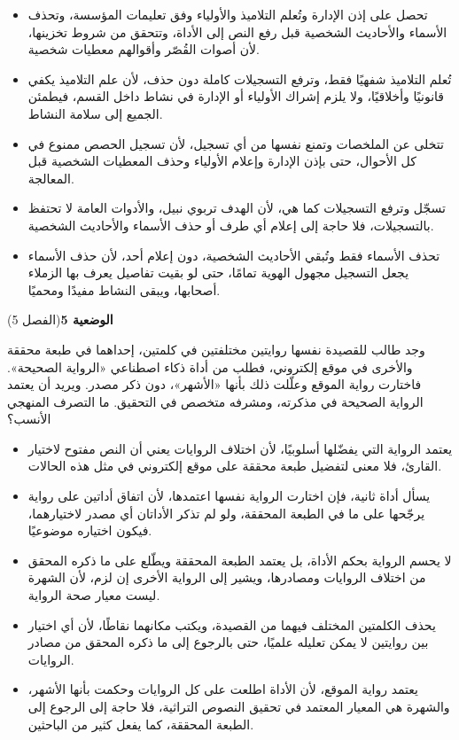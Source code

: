 \documentclass[11pt,a4paper]{article}
\begin{document}
\begin{itemize}[leftmargin=1.0cm, labelsep=6pt, itemsep=3pt, topsep=4pt, parsep=0pt]
  \item[\textbf{أ)}] تحصل على إذن الإدارة وتُعلم التلاميذ والأولياء وفق تعليمات المؤسسة، وتحذف الأسماء والأحاديث الشخصية قبل رفع النص إلى الأداة، وتتحقق من شروط تخزينها، لأن أصوات القُصّر وأقوالهم معطيات شخصية.
  \item[\textbf{ب)}] تُعلم التلاميذ شفهيًا فقط، وترفع التسجيلات كاملة دون حذف، لأن علم التلاميذ يكفي قانونيًا وأخلاقيًا، ولا يلزم إشراك الأولياء أو الإدارة في نشاط داخل القسم، فيطمئن الجميع إلى سلامة النشاط.
  \item[\textbf{ج)}] تتخلى عن الملخصات وتمنع نفسها من أي تسجيل، لأن تسجيل الحصص ممنوع في كل الأحوال، حتى بإذن الإدارة وإعلام الأولياء وحذف المعطيات الشخصية قبل المعالجة.
  \item[\textbf{د)}] تسجّل وترفع التسجيلات كما هي، لأن الهدف تربوي نبيل، والأدوات العامة لا تحتفظ بالتسجيلات، فلا حاجة إلى إعلام أي طرف أو حذف الأسماء والأحاديث الشخصية.
  \item[\textbf{هـ)}] تحذف الأسماء فقط وتُبقي الأحاديث الشخصية، دون إعلام أحد، لأن حذف الأسماء يجعل التسجيل مجهول الهوية تمامًا، حتى لو بقيت تفاصيل يعرف بها الزملاء أصحابها، ويبقى النشاط مفيدًا ومحميًا.
\end{itemize}
\par\vspace{6pt}
\noindent
{\large\khatt\textbf{الوضعية 5}}\hfill{\small(الفصل 5)}\par\nopagebreak\vspace{3pt}
\setlength{\fboxsep}{7pt}\colorbox{gray!10}{\parbox{\dimexpr\linewidth-14pt}{وجد طالب للقصيدة نفسها روايتين مختلفتين في كلمتين، إحداهما في طبعة محققة والأخرى في موقع إلكتروني، فطلب من أداة ذكاء اصطناعي «الرواية الصحيحة». فاختارت رواية الموقع وعلّلت ذلك بأنها «الأشهر»، دون ذكر مصدر. ويريد أن يعتمد الرواية الصحيحة في مذكرته، ومشرفه متخصص في التحقيق. ما التصرف المنهجي الأنسب؟}}\par\nopagebreak
\begin{itemize}[leftmargin=1.0cm, labelsep=6pt, itemsep=3pt, topsep=4pt, parsep=0pt]
  \item[\textbf{أ)}] يعتمد الرواية التي يفضّلها أسلوبيًا، لأن اختلاف الروايات يعني أن النص مفتوح لاختيار القارئ، فلا معنى لتفضيل طبعة محققة على موقع إلكتروني في مثل هذه الحالات.
  \item[\textbf{ب)}] يسأل أداة ثانية، فإن اختارت الرواية نفسها اعتمدها، لأن اتفاق أداتين على رواية يرجّحها على ما في الطبعة المحققة، ولو لم تذكر الأداتان أي مصدر لاختيارهما، فيكون اختياره موضوعيًا.
  \item[\textbf{ج)}] لا يحسم الرواية بحكم الأداة، بل يعتمد الطبعة المحققة ويطّلع على ما ذكره المحقق من اختلاف الروايات ومصادرها، ويشير إلى الرواية الأخرى إن لزم، لأن الشهرة ليست معيار صحة الرواية.
  \item[\textbf{د)}] يحذف الكلمتين المختلف فيهما من القصيدة، ويكتب مكانهما نقاطًا، لأن أي اختيار بين روايتين لا يمكن تعليله علميًا، حتى بالرجوع إلى ما ذكره المحقق من مصادر الروايات.
  \item[\textbf{هـ)}] يعتمد رواية الموقع، لأن الأداة اطلعت على كل الروايات وحكمت بأنها الأشهر، والشهرة هي المعيار المعتمد في تحقيق النصوص التراثية، فلا حاجة إلى الرجوع إلى الطبعة المحققة، كما يفعل كثير من الباحثين.
\end{itemize}
\end{document}
